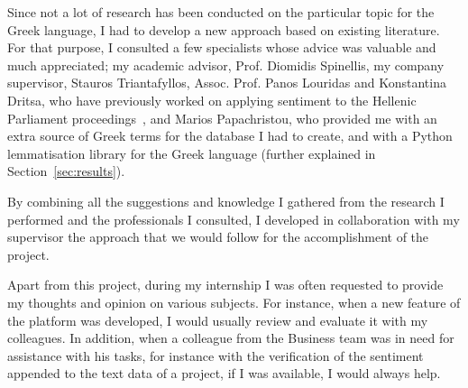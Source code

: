 Since not a lot of research has been conducted
on the particular topic for the Greek language,
I had to develop a new approach based on existing literature.
For that purpose, I consulted a few specialists
whose advice was valuable and much appreciated;
my academic advisor, Prof. Diomidis Spinellis,
my company supervisor, Stauros Triantafyllos,
Assoc. Prof. Panos Louridas and Konstantina Dritsa,
who have previously worked on applying sentiment
to the Hellenic Parliament proceedings~\cite{Dri18},
and Marios Papachristou,
who provided me with an extra source of Greek terms
for the database I had to create,
and with a Python lemmatisation library for the Greek language
(further explained in Section~\ref{sec:results}).

By combining all the suggestions and knowledge I gathered
from the research I performed and the professionals I consulted,
I developed in collaboration with my supervisor
the approach that we would follow
for the accomplishment of the project.

Apart from this project,
during my internship I was often requested
to provide my thoughts and opinion on various subjects.
For instance, when a new feature of the platform was developed,
I would usually review and evaluate it with my colleagues.
In addition, when a colleague from the Business team
was in need for assistance with his tasks,
for instance with the verification of the sentiment appended
to the text data of a project,
if I was available, I would always help.
